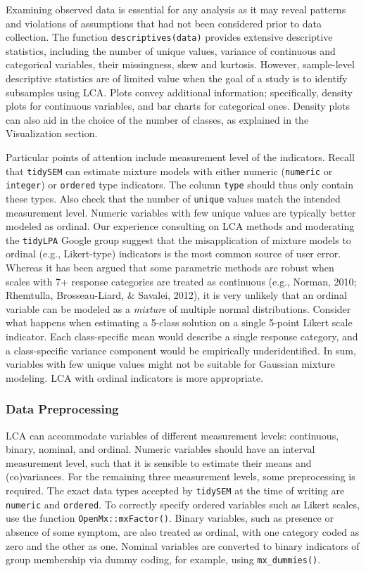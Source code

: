 \documentclass[
  ,man,floatsintext]{apa6}
\begin{document}
Examining observed data is essential for any analysis as it may reveal
patterns and violations of assumptions that had not been considered
prior to data collection.
The function \texttt{descriptives(data)} provides extensive descriptive statistics,
including the number of unique values,
variance of continuous and categorical variables,
their missingness, skew and kurtosis.
However, sample-level descriptive statistics are of limited value when the goal of a study is to identify subsamples using LCA.
Plots convey additional information; specifically, density plots for continuous variables, and bar charts
for categorical ones.
Density plots can also aid in the choice of the number of classes, as explained in the Visualization section.

Particular points of attention include measurement level of the indicators.
Recall that \texttt{tidySEM} can estimate mixture models with either numeric (\texttt{numeric} or \texttt{integer}) or \texttt{ordered} type indicators.
The column \texttt{type} should thus only contain these types.
Also check that the number of \texttt{unique} values match the intended measurement level.
Numeric variables with few unique values are typically better modeled as ordinal.
Our experience consulting on LCA methods
and moderating the \texttt{tidyLPA} Google group suggest that the
misapplication of mixture models to ordinal (e.g., Likert-type)
indicators is the most common source of user error. Whereas it has been
argued that some parametric methods are robust when scales with 7+
response categories are treated as continuous (e.g., Norman, 2010; Rhemtulla, Brosseau-Liard, \& Savalei, 2012),
it is very unlikely
that an ordinal variable can be modeled as a \emph{mixture} of multiple
normal distributions.
Consider what happens when estimating a 5-class solution on a single 5-point Likert scale indicator.
Each class-specific mean would describe a single response
category,
and a class-specific variance component would be empirically underidentified.
In sum, variables with few unique values might not be suitable for Gaussian mixture modeling.
LCA with ordinal indicators is more appropriate.

\hypertarget{data-preprocessing}{%
\subsubsection{Data Preprocessing}\label{data-preprocessing}}

LCA can accommodate variables of different measurement levels: continuous, binary, nominal, and ordinal.
Numeric variables should have an interval measurement level,
such that it is sensible to estimate their means and (co)variances.
For the remaining three measurement levels,
some preprocessing is required.
The exact data types accepted by \texttt{tidySEM} at the time of writing are \texttt{numeric} and \texttt{ordered}.
To correctly specify ordered variables
such as Likert scales,
use the function \texttt{OpenMx::mxFactor()}.
Binary variables,
such as presence or absence of some symptom, are also treated as ordinal, with one category coded as zero and the other as one.
Nominal variables are converted to binary indicators of group membership via dummy coding, for example, using \texttt{mx\_dummies()}.
\end{document}
